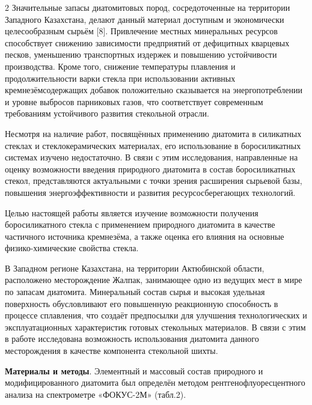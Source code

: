 \begin{multicols}{2}
Значительные запасы диатомитовых пород, сосредоточенные на территории
Западного Казахстана, делают данный материал доступным и экономически
целесообразным сырьём {[}8{]}. Привлечение местных минеральных ресурсов
способствует снижению зависимости предприятий от дефицитных кварцевых
песков, уменьшению транспортных издержек и повышению устойчивости
производства. Кроме того, снижение температуры плавления и
продолжительности варки стекла при использовании активных
кремнезёмсодержащих добавок положительно сказывается на
энергопотреблении и уровне выбросов парниковых газов, что соответствует
современным требованиям устойчивого развития стекольной отрасли.

Несмотря на наличие работ, посвящённых применению диатомита в силикатных
стеклах и стеклокерамических материалах, его использование в
боросиликатных системах изучено недостаточно. В связи с этим
исследования, направленные на оценку возможности введения природного
диатомита в состав боросиликатных стекол, представляются актуальными с
точки зрения расширения сырьевой базы, повышения энергоэффективности и
развития ресурсосберегающих технологий.

Целью настоящей работы является изучение возможности получения
боросиликатного стекла с применением природного диатомита в качестве
частичного источника кремнезёма, а также оценка его влияния на основные
физико-химические свойства стекла.

В Западном регионе Казахстана, на территории Актюбинской области,
расположено месторождение Жалпак, занимающее одно из ведущих мест в мире
по запасам диатомита. Минеральный состав сырья и высокая удельная
поверхность обусловливают его повышенную реакционную способность в
процессе сплавления, что создаёт предпосылки для улучшения
технологических и эксплуатационных характеристик готовых стекольных
материалов. В связи с этим в работе исследована возможность
использования диатомита данного месторождения в качестве компонента
стекольной шихты.

{\bfseries Материалы и методы}. Элементный и массовый состав природного и
модифицированного диатомита был определён методом
рентгенофлуоресцентного анализа на спектрометре «ФОКУС-2М» (табл.2).
\end{multicols}

